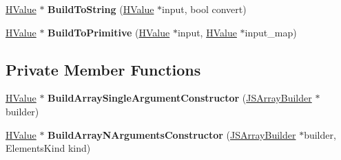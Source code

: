 \begin{DoxyCompactItemize}
\item 
\hyperlink{classv8_1_1internal_1_1_h_value}{H\+Value} $\ast$ {\bfseries Build\+To\+String} (\hyperlink{classv8_1_1internal_1_1_h_value}{H\+Value} $\ast$input, bool convert)\hypertarget{classv8_1_1internal_1_1_code_stub_graph_builder_base_ae7a797eaf737de31cc0fa51ddd976627}{}\label{classv8_1_1internal_1_1_code_stub_graph_builder_base_ae7a797eaf737de31cc0fa51ddd976627}

\item 
\hyperlink{classv8_1_1internal_1_1_h_value}{H\+Value} $\ast$ {\bfseries Build\+To\+Primitive} (\hyperlink{classv8_1_1internal_1_1_h_value}{H\+Value} $\ast$input, \hyperlink{classv8_1_1internal_1_1_h_value}{H\+Value} $\ast$input\+\_\+map)\hypertarget{classv8_1_1internal_1_1_code_stub_graph_builder_base_a8d689ca2ec383ebfe7815375a02066c1}{}\label{classv8_1_1internal_1_1_code_stub_graph_builder_base_a8d689ca2ec383ebfe7815375a02066c1}

\end{DoxyCompactItemize}
\subsection*{Private Member Functions}
\begin{DoxyCompactItemize}
\item 
\hyperlink{classv8_1_1internal_1_1_h_value}{H\+Value} $\ast$ {\bfseries Build\+Array\+Single\+Argument\+Constructor} (\hyperlink{classv8_1_1internal_1_1_h_graph_builder_1_1_j_s_array_builder}{J\+S\+Array\+Builder} $\ast$builder)\hypertarget{classv8_1_1internal_1_1_code_stub_graph_builder_base_a35c89114a0d0805d5cb4de08e6d1dd6a}{}\label{classv8_1_1internal_1_1_code_stub_graph_builder_base_a35c89114a0d0805d5cb4de08e6d1dd6a}

\item 
\hyperlink{classv8_1_1internal_1_1_h_value}{H\+Value} $\ast$ {\bfseries Build\+Array\+N\+Arguments\+Constructor} (\hyperlink{classv8_1_1internal_1_1_h_graph_builder_1_1_j_s_array_builder}{J\+S\+Array\+Builder} $\ast$builder, Elements\+Kind kind)\hypertarget{classv8_1_1internal_1_1_code_stub_graph_builder_base_a07400df1296a9f37735a48e4b20faef3}{}\label{classv8_1_1internal_1_1_code_stub_graph_builder_base_a07400df1296a9f37735a48e4b20faef3}

\end{DoxyCompactItemize}
